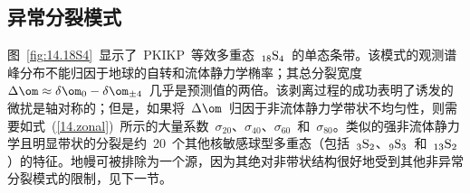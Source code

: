 \subsection{异常分裂模式}
%
%
%
%
\label{14.sec.incsplit}

图~\ref{fig:14.18S4}~显示了~PKIKP~等效多重态~${}_{18}{\rm S}_4$~的单态条带。该模式的观测谱峰分布不能归因于地球的自转和流体静力学椭率；其总分裂宽度~$\Delta\om
\approx\delta\om_0-\delta\om_{\pm 4}$~几乎是预测值的两倍。该剥离过程的成功表明了诱发的微扰是轴对称的；但是，如果将~$\Delta\om$~归因于非流体静力学带状不均匀性，则需要如式~(\ref{14.zonal})~所示的大量系数~$\sigma_{20}$、$\sigma_{40}$、$\sigma_{60}$~和~$\sigma_{80}$。类似的强非流体静力学且明显带状的分裂是约~20~个其他核敏感球型多重态（包括~${}_3{\rm S}_2$、${}_9{\rm S}_3$~和~${}_{13}{\rm S}_2$）的特征。地幔可被排除为一个源，因为其绝对非带状结构很好地受到其他非异常分裂模式的限制，见下一节。

